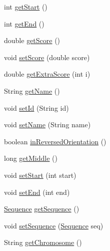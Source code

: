 \begin{DoxyCompactItemize}
int \hyperlink{classbroad_1_1core_1_1sequence_1_1_sequence_region_afcca12aead494125f57be12abe9e2adb}{get\+Start} ()
\item 
int \hyperlink{classbroad_1_1core_1_1sequence_1_1_sequence_region_a1f2cbaafc85940a5c2719243f4640249}{get\+End} ()
\item 
double \hyperlink{classbroad_1_1core_1_1sequence_1_1_sequence_region_ab4107ed17a9cefec0e99ba9d5481cced}{get\+Score} ()
\item 
void \hyperlink{classbroad_1_1core_1_1sequence_1_1_sequence_region_a42b83bc601a115dbf7e848aa24356ebd}{set\+Score} (double score)
\item 
double \hyperlink{classbroad_1_1core_1_1sequence_1_1_sequence_region_add4b041421355dc90ba6a47169d76797}{get\+Extra\+Score} (int i)
\item 
String \hyperlink{classbroad_1_1core_1_1sequence_1_1_sequence_region_abe729e8af2a1d244f41ddf93373ca829}{get\+Name} ()
\item 
void \hyperlink{classbroad_1_1core_1_1sequence_1_1_sequence_region_ad8ad1b1aad94d077e5a65cc57bcecbbc}{set\+Id} (String id)
\item 
void \hyperlink{classbroad_1_1core_1_1sequence_1_1_sequence_region_ab7e684dd06da0b0e01fda2b44847bc9b}{set\+Name} (String name)
\item 
boolean \hyperlink{classbroad_1_1core_1_1sequence_1_1_sequence_region_aebbe9fecbd89dfb53c258737e94aab9a}{in\+Reversed\+Orientation} ()
\item 
long \hyperlink{classbroad_1_1core_1_1sequence_1_1_sequence_region_aefecde331a2d5fc81cfc4e63c02cdc46}{get\+Middle} ()
\item 
void \hyperlink{classbroad_1_1core_1_1sequence_1_1_sequence_region_a999b6323d9f72d3e701608001bf98101}{set\+Start} (int start)
\item 
void \hyperlink{classbroad_1_1core_1_1sequence_1_1_sequence_region_af7d15e288735f4e08a3b66ad07690297}{set\+End} (int end)
\item 
\hyperlink{classbroad_1_1core_1_1sequence_1_1_sequence}{Sequence} \hyperlink{classbroad_1_1core_1_1sequence_1_1_sequence_region_a263ddf2c510c260b61b07f9d642c5f81}{get\+Sequence} ()
\item 
void \hyperlink{classbroad_1_1core_1_1sequence_1_1_sequence_region_a8428d89d0d76f57b644d03c168febdb3}{set\+Sequence} (\hyperlink{classbroad_1_1core_1_1sequence_1_1_sequence}{Sequence} seq)
\item 
String \hyperlink{classbroad_1_1core_1_1sequence_1_1_sequence_region_a91d1cdf7cb2c148bf44e2ba57320b205}{get\+Chromosome} ()

\end{DoxyCompactItemize}
